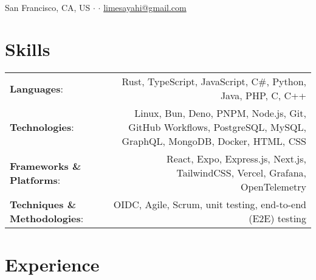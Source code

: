 \documentclass[letterpaper,10pt]{article} %
\begin{document}
\pagestyle{empty}
\par
{\\
\footnotesize{
San Francisco, CA, US
$\cdot$
\href{tel:+1-513-484-0972}{\color{black}{(513) 484-0972}}
$\cdot$
\href{mailto:limesayahi@gmail.com}{\color{black}limesayahi@gmail.com}\\
}}

\footnotesize{\textbf{\color{summarycolour}{Systems programmer \& web developer with experience contributing to startups \& commercial open-source software. Knowledgable in low-level programming, interested in building reliable, fast, memory-safe software that scales.}}}

\section{Skills}
\scriptsize{
\begin{tabular*}{\linewidth}{@{\extracolsep{\fill}} lr }
\textbf{Languages}: & Rust, TypeScript, JavaScript, C\#, Python, Java, PHP, C, C++\\
\textbf{Technologies}: & Linux, Bun, Deno, PNPM, Node.js, Git, GitHub Workflows, PostgreSQL, MySQL, GraphQL, MongoDB, Docker, HTML, CSS\\
\textbf{Frameworks \& Platforms}: & React, Expo, Express.js, Next.js, TailwindCSS, Vercel, Grafana, OpenTelemetry\\
\textbf{Techniques \& Methodologies}: & OIDC, Agile, Scrum, unit testing, end-to-end (E2E) testing
\end{tabular*}}

\section{Experience}
\end{document}
